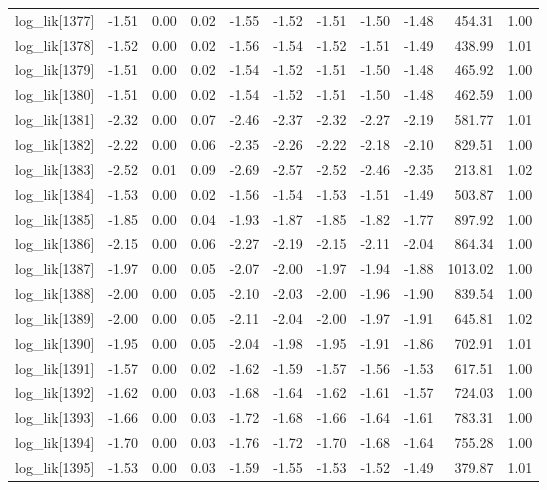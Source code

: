 \begin{table}[ht]
\begin{tabular}{rrrrrrrrrrr}
  log\_lik[1377] & -1.51 & 0.00 & 0.02 & -1.55 & -1.52 & -1.51 & -1.50 & -1.48 & 454.31 & 1.00 \\ 
  log\_lik[1378] & -1.52 & 0.00 & 0.02 & -1.56 & -1.54 & -1.52 & -1.51 & -1.49 & 438.99 & 1.01 \\ 
  log\_lik[1379] & -1.51 & 0.00 & 0.02 & -1.54 & -1.52 & -1.51 & -1.50 & -1.48 & 465.92 & 1.00 \\ 
  log\_lik[1380] & -1.51 & 0.00 & 0.02 & -1.54 & -1.52 & -1.51 & -1.50 & -1.48 & 462.59 & 1.00 \\ 
  log\_lik[1381] & -2.32 & 0.00 & 0.07 & -2.46 & -2.37 & -2.32 & -2.27 & -2.19 & 581.77 & 1.01 \\ 
  log\_lik[1382] & -2.22 & 0.00 & 0.06 & -2.35 & -2.26 & -2.22 & -2.18 & -2.10 & 829.51 & 1.00 \\ 
  log\_lik[1383] & -2.52 & 0.01 & 0.09 & -2.69 & -2.57 & -2.52 & -2.46 & -2.35 & 213.81 & 1.02 \\ 
  log\_lik[1384] & -1.53 & 0.00 & 0.02 & -1.56 & -1.54 & -1.53 & -1.51 & -1.49 & 503.87 & 1.00 \\ 
  log\_lik[1385] & -1.85 & 0.00 & 0.04 & -1.93 & -1.87 & -1.85 & -1.82 & -1.77 & 897.92 & 1.00 \\ 
  log\_lik[1386] & -2.15 & 0.00 & 0.06 & -2.27 & -2.19 & -2.15 & -2.11 & -2.04 & 864.34 & 1.00 \\ 
  log\_lik[1387] & -1.97 & 0.00 & 0.05 & -2.07 & -2.00 & -1.97 & -1.94 & -1.88 & 1013.02 & 1.00 \\ 
  log\_lik[1388] & -2.00 & 0.00 & 0.05 & -2.10 & -2.03 & -2.00 & -1.96 & -1.90 & 839.54 & 1.00 \\ 
  log\_lik[1389] & -2.00 & 0.00 & 0.05 & -2.11 & -2.04 & -2.00 & -1.97 & -1.91 & 645.81 & 1.02 \\ 
  log\_lik[1390] & -1.95 & 0.00 & 0.05 & -2.04 & -1.98 & -1.95 & -1.91 & -1.86 & 702.91 & 1.01 \\ 
  log\_lik[1391] & -1.57 & 0.00 & 0.02 & -1.62 & -1.59 & -1.57 & -1.56 & -1.53 & 617.51 & 1.00 \\ 
  log\_lik[1392] & -1.62 & 0.00 & 0.03 & -1.68 & -1.64 & -1.62 & -1.61 & -1.57 & 724.03 & 1.00 \\ 
  log\_lik[1393] & -1.66 & 0.00 & 0.03 & -1.72 & -1.68 & -1.66 & -1.64 & -1.61 & 783.31 & 1.00 \\ 
  log\_lik[1394] & -1.70 & 0.00 & 0.03 & -1.76 & -1.72 & -1.70 & -1.68 & -1.64 & 755.28 & 1.00 \\ 
  log\_lik[1395] & -1.53 & 0.00 & 0.03 & -1.59 & -1.55 & -1.53 & -1.52 & -1.49 & 379.87 & 1.01 \\ 

\end{tabular}
\end{table}
